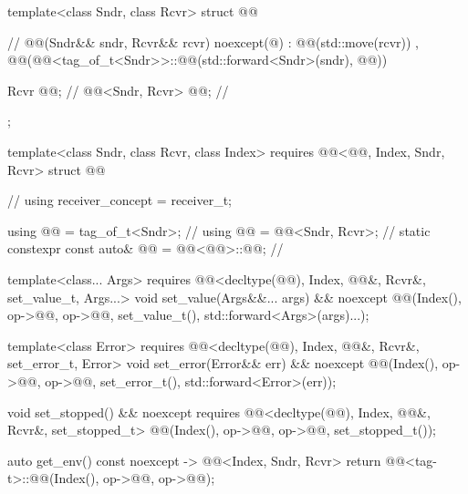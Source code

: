 \begin{codeblock}
{  template<class Sndr, class Rcvr>
  struct @@ {                                          // \expos
    @@(Sndr&& sndr, Rcvr&& rcvr) noexcept(@\seebelow@)
      : @@(std::move(rcvr))
      , @@(@@<tag_of_t<Sndr>>::@@(std::forward<Sndr>(sndr), @@)) { }

    Rcvr @@;                                                  // \expos
    @@<Sndr, Rcvr> @@;                               // \expos
  };

  template<class Sndr, class Rcvr, class Index>
    requires @@<@@, Index, Sndr, Rcvr>
  struct @@ {                                       // \expos
    using receiver_concept = receiver_t;

    using @@ = tag_of_t<Sndr>;                               // \expos
    using @@ = @@<Sndr, Rcvr>;                     // \expos
    static constexpr const auto& @@ = @@<@@>::@@;         // \expos

    template<class... Args>
      requires @@<decltype(@@), Index, @@&, Rcvr&, set_value_t, Args...>
    void set_value(Args&&... args) && noexcept {
      @@(Index(), op->@@, op->@@, set_value_t(), std::forward<Args>(args)...);
    }

    template<class Error>
      requires @@<decltype(@@), Index, @@&, Rcvr&, set_error_t, Error>
    void set_error(Error&& err) && noexcept {
      @@(Index(), op->@@, op->@@, set_error_t(), std::forward<Error>(err));
    }

    void set_stopped() && noexcept
      requires @@<decltype(@@), Index, @@&, Rcvr&, set_stopped_t> {
      @@(Index(), op->@@, op->@@, set_stopped_t());
    }

    auto get_env() const noexcept -> @@<Index, Sndr, Rcvr> {
      return @@<tag-t>::@@(Index(), op->@@, op->@@);
    }

}}
\end{codeblock}
